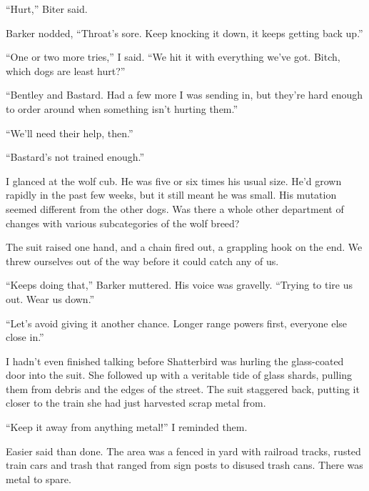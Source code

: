 ``Hurt,'' Biter said.



Barker nodded, ``Throat's sore.  Keep knocking it down, it keeps getting back up.''



``One or two more tries,'' I said.  ``We hit it with everything we've got.  Bitch, which dogs are least hurt?''



``Bentley and Bastard.  Had a few more I was sending in, but they're hard enough to order around when something isn't hurting them.''



``We'll need their help, then.''



``Bastard's not trained enough.''



I glanced at the wolf cub.  He was five or six times his usual size.  He'd grown rapidly in the past few weeks, but it still meant he was small.  His mutation seemed different from the other dogs.  Was there a whole other department of changes with various subcategories of the wolf breed?



The suit raised one hand, and a chain fired out, a grappling hook on the end.  We threw ourselves out of the way before it could catch any of us.



``Keeps doing that,'' Barker muttered.  His voice was gravelly.  ``Trying to tire us out.  Wear us down.''



``Let's avoid giving it another chance.  Longer range powers first, everyone else close in.''



I hadn't even finished talking before Shatterbird was hurling the glass-coated door into the suit.  She followed up with a veritable tide of glass shards, pulling them from debris and the edges of the street.  The suit staggered back, putting it closer to the train she had just harvested scrap metal from.



``Keep it away from anything metal!''  I reminded them.



Easier said than done.  The area was a fenced in yard with railroad tracks, rusted train cars and trash that ranged from sign posts to disused trash cans.  There was metal to spare.



